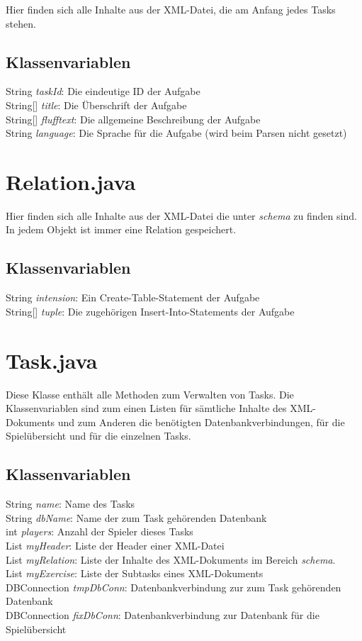 \documentclass[11pt]{report}
\begin{document}
Hier finden sich alle Inhalte aus der XML-Datei, die am Anfang jedes Tasks stehen.

\subsection*{Klassenvariablen}

String \textit{taskId}: Die eindeutige ID der Aufgabe \\
String[] \textit{title}: Die Überschrift der Aufgabe \\
String[] \textit{flufftext}: Die allgemeine Beschreibung der Aufgabe \\
String \textit{language}: Die Sprache für die Aufgabe (wird beim Parsen nicht gesetzt)

\section{Relation.java}

Hier finden sich alle Inhalte aus der XML-Datei die unter \textit{schema} zu finden sind. In jedem Objekt ist immer eine Relation gespeichert.

\subsection*{Klassenvariablen}
String \textit{intension}: Ein Create-Table-Statement der Aufgabe \\
String[] \textit{tuple}: Die zugehörigen Insert-Into-Statements der Aufgabe

\section{Task.java}

Diese Klasse enthält alle Methoden zum Verwalten von Tasks. Die Klassenvariablen sind zum einen Listen für sämtliche Inhalte des XML-Dokuments und zum Anderen die benötigten Datenbankverbindungen, für die Spielübersicht und für die einzelnen Tasks.

\subsection*{Klassenvariablen}
String \textit{name}: Name des Tasks \\
String \textit{dbName}: Name der zum Task gehörenden Datenbank \\
int \textit{players}: Anzahl der Spieler dieses Tasks \\
List \textit{myHeader}: Liste der Header einer XML-Datei \\
List \textit{myRelation}: Liste der Inhalte des XML-Dokuments im Bereich \textit{schema}. \\
List \textit{myExercise}: Liste der Subtasks eines XML-Dokuments \\
DBConnection \textit{tmpDbConn}: Datenbankverbindung zur zum Task gehörenden Datenbank \\
DBConnection \textit{fixDbConn}: Datenbankverbindung zur Datenbank für die Spielübersicht
\end{document}
